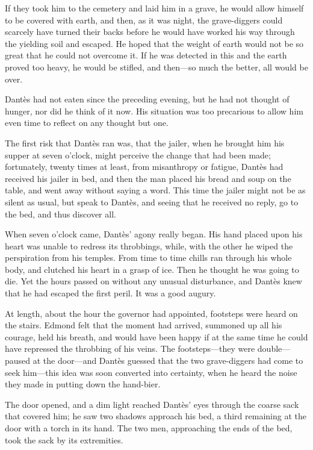 If they took him to the cemetery and laid him in a grave, he would
allow himself to be covered with earth, and then, as it was night, the
grave-diggers could scarcely have turned their backs before he would
have worked his way through the yielding soil and escaped. He hoped
that the weight of earth would not be so great that he could not
overcome it. If he was detected in this and the earth proved too heavy,
he would be stifled, and then—so much the better, all would be over.

Dantès had not eaten since the preceding evening, but he had not
thought of hunger, nor did he think of it now. His situation was too
precarious to allow him even time to reflect on any thought but one.

The first risk that Dantès ran was, that the jailer, when he brought
him his supper at seven o’clock, might perceive the change that had
been made; fortunately, twenty times at least, from misanthropy or
fatigue, Dantès had received his jailer in bed, and then the man placed
his bread and soup on the table, and went away without saying a word.
This time the jailer might not be as silent as usual, but speak to
Dantès, and seeing that he received no reply, go to the bed, and thus
discover all.

When seven o’clock came, Dantès’ agony really began. His hand placed
upon his heart was unable to redress its throbbings, while, with the
other he wiped the perspiration from his temples. From time to time
chills ran through his whole body, and clutched his heart in a grasp of
ice. Then he thought he was going to die. Yet the hours passed on
without any unusual disturbance, and Dantès knew that he had escaped
the first peril. It was a good augury.

At length, about the hour the governor had appointed, footsteps were
heard on the stairs. Edmond felt that the moment had arrived, summoned
up all his courage, held his breath, and would have been happy if at
the same time he could have repressed the throbbing of his veins. The
footsteps—they were double—paused at the door—and Dantès guessed that
the two grave-diggers had come to seek him—this idea was soon converted
into certainty, when he heard the noise they made in putting down the
hand-bier.

The door opened, and a dim light reached Dantès’ eyes through the
coarse sack that covered him; he saw two shadows approach his bed, a
third remaining at the door with a torch in its hand. The two men,
approaching the ends of the bed, took the sack by its extremities.

